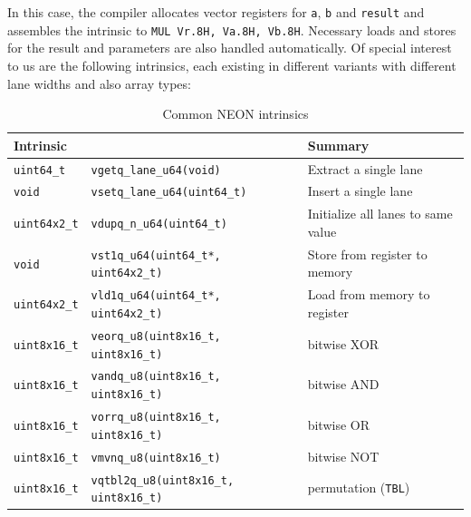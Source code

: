 In this case, the compiler allocates vector registers for \texttt{a},
\texttt{b} and \texttt{result} and assembles the intrinsic to \texttt{MUL
Vr.8H, Va.8H, Vb.8H}. Necessary loads and stores for the result and parameters
are also handled automatically. Of special interest to us are the following
intrinsics, each existing in different variants with different lane widths and
also array types: \\

\begin{table}[h!]
    \centering
    \footnotesize
    \caption{Common NEON intrinsics}
    \begin{tabularx}{\textwidth}{llX}
        \toprule
        Intrinsic && Summary \\
        \midrule
        \texttt{uint64\_t} & \texttt{vgetq\_lane\_u64(void)} & Extract a single lane \\
        \midrule
        \texttt{void} & \texttt{vsetq\_lane\_u64(uint64\_t)} & Insert a single lane \\
        \midrule
        \texttt{uint64x2\_t} & \texttt{vdupq\_n\_u64(uint64\_t)} & Initialize all lanes to same value \\
        \midrule
        \texttt{void} & \texttt{vst1q\_u64(uint64\_t*, uint64x2\_t)} & Store from register to memory \\
        \midrule
        \texttt{uint64x2\_t} & \texttt{vld1q\_u64(uint64\_t*, uint64x2\_t)} & Load from memory to register \\
        \midrule
        \texttt{uint8x16\_t} & \texttt{veorq\_u8(uint8x16\_t, uint8x16\_t)} & bitwise XOR \\
        \midrule
        \texttt{uint8x16\_t} & \texttt{vandq\_u8(uint8x16\_t, uint8x16\_t)} & bitwise AND \\
        \midrule
        \texttt{uint8x16\_t} & \texttt{vorrq\_u8(uint8x16\_t, uint8x16\_t)} & bitwise OR \\
        \midrule
        \texttt{uint8x16\_t} & \texttt{vmvnq\_u8(uint8x16\_t)} & bitwise NOT \\
        \midrule
        \texttt{uint8x16\_t} & \texttt{vqtbl2q\_u8(uint8x16\_t, uint8x16\_t)} & permutation (\texttt{TBL}) \\
        \bottomrule
    \end{tabularx}
\end{table}

